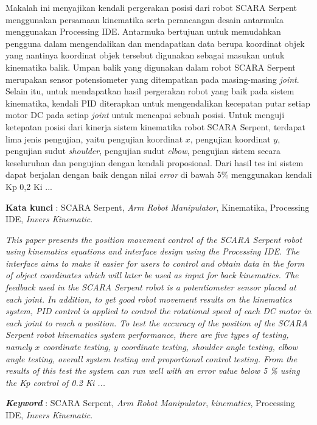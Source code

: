 \documentclass{DTEDI_KP}
\begin{document}
\tableofcontents
{}
\listoftables
{}
\listoffigures
{}

\begin{abstractind}
	Makalah ini menyajikan kendali pergerakan posisi dari robot SCARA Serpent menggunakan persamaan kinematika serta perancangan desain antarmuka menggunakan Processing IDE. Antarmuka bertujuan untuk memudahkan pengguna dalam mengendalikan dan mendapatkan data berupa koordinat objek yang nantinya koordinat objek tersebut digunakan sebagai masukan untuk kinematika balik. Umpan balik yang digunakan dalam robot SCARA Serpent merupakan sensor potensiometer yang ditempatkan pada masing-masing \textit{joint}. Selain itu, untuk mendapatkan hasil pergerakan robot yang baik pada sistem kinematika, kendali PID diterapkan untuk mengendalikan kecepatan putar setiap motor DC pada setiap \textit{joint} untuk mencapai sebuah posisi. Untuk menguji ketepatan posisi dari kinerja sistem kinematika robot SCARA Serpent, terdapat lima jenis pengujian, yaitu pengujian koordinat $x$, pengujian koordinat $y$, pengujian sudut \textit{shoulder}, pengujian sudut \textit{elbow}, pengujian sistem secara keseluruhan dan pengujian dengan kendali proposional. Dari hasil tes ini sistem dapat berjalan dengan baik dengan nilai \textit{error} di bawah 5\% menggunakan kendali Kp 0,2 Ki ...
	
	
	\textbf{Kata kunci }: SCARA Serpent, \textit{Arm Robot Manipulator}, Kinematika, Processing IDE, \textit{Invers Kinematic}.
\end{abstractind}

\begin{abstracteng}
	\textit{This paper presents the position movement control of the SCARA Serpent robot using kinematics equations and interface design using the Processing IDE. The interface aims to make it easier for users to control and obtain data in the form of object coordinates which will later be used as input for back kinematics. The feedback used in the SCARA Serpent robot is a potentiometer sensor placed at each joint. In addition, to get good robot movement results on the kinematics system, PID control is applied to control the rotational speed of each DC motor in each joint to reach a position. To test the accuracy of the position of the SCARA Serpent robot kinematics system performance, there are five types of testing, namely $x$ coordinate testing, $y$ coordinate testing, shoulder angle testing, elbow angle testing, overall system testing and proportional control testing. From the results of this test the system can run well with an error value below 5 \% using the Kp control of 0.2 Ki ...}
	
	
	\textit{\textbf{Keyword}} : SCARA Serpent, \textit{Arm Robot Manipulator}, \textit{kinematics}, Processing IDE, \textit{Invers Kinematic}.
\end{abstracteng}

\newpage
\setcounter{page}{1}








\end{document}
